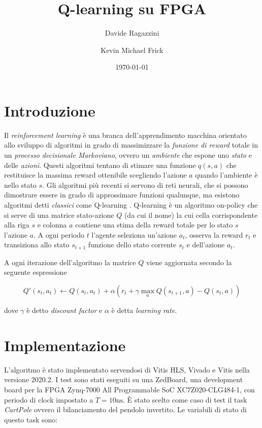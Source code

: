 \documentclass{article}
\title{Q-learning su FPGA}
\date{\today}
\author{Davide Ragazzini \and Kevin Michael Frick}
\begin{document}
\maketitle

\section{Introduzione}
Il \emph{reinforcement learning} è una branca dell'apprendimento macchina orientato allo sviluppo di algoritmi in grado di massimizzare la \emph{funzione di reward} totale in un \emph{processo decisionale Markoviano}, ovvero un \emph{ambiente} che espone uno \emph{stato} e delle \emph{azioni}. 
Questi algoritmi tentano di stimare una funzione $q(s, a)$ che restituisce la massima reward ottenibile scegliendo l'azione $a$ quando l'ambiente è nello stato $s$. 
Gli algoritmi più recenti si servono di reti neurali, che si possono dimostrare essere in grado di approssimare funzioni qualunque, ma esistono algoritmi detti \emph{classici} come Q-learning \citep{watkins_learning_1989}. 
Q-learning è un algoritmo on-policy che si serve di una matrice stato-azione $Q$ (da cui il nome) la cui cella corrispondente alla riga $s$ e colonna $a$ contiene una stima della reward totale per lo stato $s$ l'azione $a$. 
A ogni periodo $t$ l'agente seleziona un'azione $a_t$, osserva la reward $r_t$ e transiziona allo stato $s_{t + 1}$ funzione dello stato corrente $s_t$ e dell'azione $a_t$. 

A ogni iterazione dell'algoritmo la matrice $Q$ viene aggiornata secondo la seguente espressione

$$
Q'(s_t, a_t) \leftarrow Q(s_t, a_t) + \alpha (r_t + \gamma \max_a Q(s_{t+1}, a) - Q(s_t, a))
$$

dove $\gamma$ è detto \emph{discount factor} e $\alpha$ è detta \emph{learning rate}. 

\section{Implementazione}
L'algoritmo è stato implementato servendosi di Vitis HLS, Vivado e Vitis nella versione 2020.2. 
I test sono stati eseguiti su una ZedBoard, una development board per la FPGA Zynq-7000 All Programmable SoC XC7Z020-CLG484-1, con periodo di clock impostato a $T = 10 \textrm{ns}$.
È stato scelto come caso di test il task \emph{CartPole} ovvero il bilanciamento del pendolo invertito. 
Le variabili di stato di questo task sono:
\end{document}
